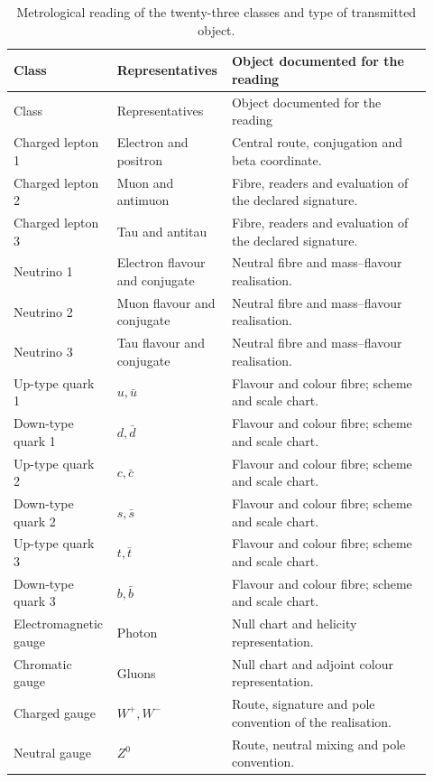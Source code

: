 \begingroup
\small
\setlength{\tabcolsep}{3pt}
\begin{longtable}{p{0.20\linewidth}p{0.25\linewidth}p{0.47\linewidth}}
\caption{Metrological reading of the twenty-three classes and type of transmitted object.}
\label{tab:vi-clases-metrologia}\\
\toprule
Class & Representatives & Object documented for the reading\\
\midrule
\endfirsthead
\toprule
Class & Representatives & Object documented for the reading\\
\midrule
\endhead
\bottomrule
\endfoot
Charged lepton 1 & Electron and positron & Central route, conjugation and beta coordinate.\\
Charged lepton 2 & Muon and antimuon & Fibre, readers and evaluation of the declared signature.\\
Charged lepton 3 & Tau and antitau & Fibre, readers and evaluation of the declared signature.\\
Neutrino 1 & Electron flavour and conjugate & Neutral fibre and mass--flavour realisation.\\
Neutrino 2 & Muon flavour and conjugate & Neutral fibre and mass--flavour realisation.\\
Neutrino 3 & Tau flavour and conjugate & Neutral fibre and mass--flavour realisation.\\
Up-type quark 1 & \(u,\bar u\) & Flavour and colour fibre; scheme and scale chart.\\
Down-type quark 1 & \(d,\bar d\) & Flavour and colour fibre; scheme and scale chart.\\
Up-type quark 2 & \(c,\bar c\) & Flavour and colour fibre; scheme and scale chart.\\
Down-type quark 2 & \(s,\bar s\) & Flavour and colour fibre; scheme and scale chart.\\
Up-type quark 3 & \(t,\bar t\) & Flavour and colour fibre; scheme and scale chart.\\
Down-type quark 3 & \(b,\bar b\) & Flavour and colour fibre; scheme and scale chart.\\
Electromagnetic gauge & Photon & Null chart and helicity representation.\\
Chromatic gauge & Gluons & Null chart and adjoint colour representation.\\
Charged gauge & \(W^+,W^-\) & Route, signature and pole convention of the realisation.\\
Neutral gauge & \(Z^0\) & Route, neutral mixing and pole convention.\\

\end{longtable}
